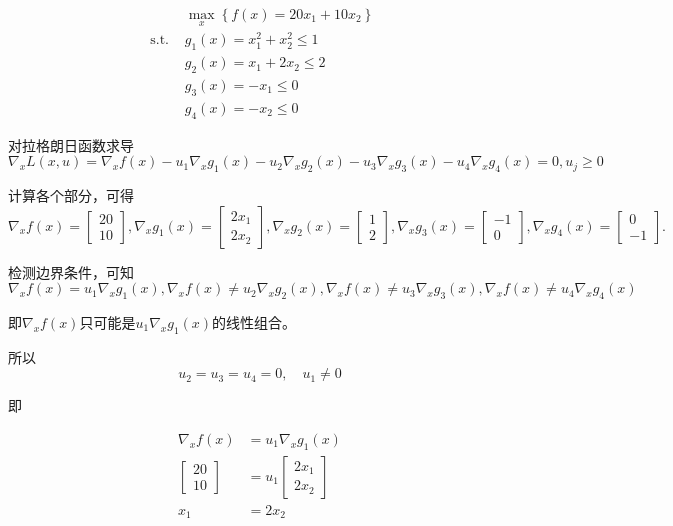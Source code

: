 \begin{example}

    \begin{problem}
$$
\begin{aligned}
    &\max _{x}\left\{f(x)=20 x_{1}+10 x_{2}\right\} \\
  \text{ s.t. }  &   g_{1}(x)=x_{1}^{2}+x_{2}^{2} \leq 1 \\
  & g_{2}(x)=x_{1}+2 x_{2} \leq 2 \\
  &  g_{3}(x)=-x_{1} \leq 0 \\
    & g_{4}(x)=-x_{2} \leq 0 
\end{aligned}
$$
\end{problem}

对拉格朗日函数求导
$$ \nabla_{x} L(x, u)=\nabla_{x} f(x)-u_{1} \nabla_{x} g_{1}(x)-u_{2} \nabla_{x} g_{2}(x)-u_{3} \nabla_{x} g_{3}(x)-u_{4} \nabla_{x} g_{4}(x)=0, u_{j} \geq 0 $$

计算各个部分，可得
$$ \nabla_{x} f(x)=\left[\begin{array}{c}20 \\ 10\end{array}\right], \nabla_{x} g_{1}(x)=\left[\begin{array}{c}2 x_{1} \\ 2 x_{2}\end{array}\right], \nabla_{x} g_{2}(x)=\left[\begin{array}{l}1 \\ 2\end{array}\right], \nabla_{x} g_{3}(x)=\left[\begin{array}{l}-1 \\ 0\end{array}\right], \nabla_{x} g_{4}(x)=\left[\begin{array}{l}0 \\ -1\end{array}\right] . $$

检测边界条件，可知
$$ \nabla_{x} f(x)=u_{1} \nabla_{x} g_{1}(x), \nabla_{x} f(x) \neq u_{2} \nabla_{x} g_{2}(x), \nabla_{x} f(x) \neq u_{3} \nabla_{x} g_{3}(x), \nabla_{x} f(x) \neq u_{4} \nabla_{x} g_{4}(x) $$

即$\nabla_{x} f(x)$只可能是$u_{1} \nabla_{x} g_{1}(x)$的线性组合。

所以
$$ u_{2}=u_{3}=u_{4}=0, \quad u_{1} \neq 0 $$

即

$$
\begin{aligned}
    \nabla_{x} f(x)&=u_{1} \nabla_{x} g_{1}(x)\\
\left[\begin{array}{c}
20 \\
10
\end{array}\right]&=u_{1}\left[\begin{array}{c}
2 x_{1} \\
2 x_{2}
\end{array}\right]\\
x_{1}&=2 x_{2} 
\end{aligned}
$$


\end{example}
